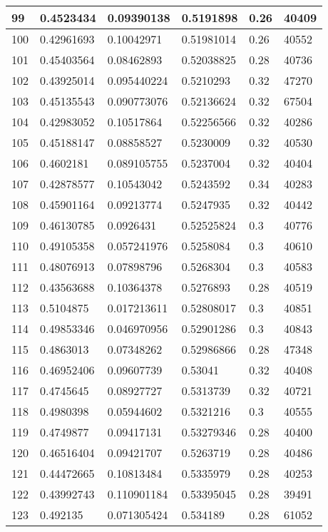 \begin{longtable}{|l|l|l|l|l|l|}
99 & 0.4523434 & 0.09390138 & 0.5191898 & 0.26 & 40409 \\ \hline 
100 & 0.42961693 & 0.10042971 & 0.51981014 & 0.26 & 40552 \\ \hline 
101 & 0.45403564 & 0.08462893 & 0.52038825 & 0.28 & 40736 \\ \hline 
102 & 0.43925014 & 0.095440224 & 0.5210293 & 0.32 & 47270 \\ \hline 
103 & 0.45135543 & 0.090773076 & 0.52136624 & 0.32 & 67504 \\ \hline 
104 & 0.42983052 & 0.10517864 & 0.52256566 & 0.32 & 40286 \\ \hline 
105 & 0.45188147 & 0.08858527 & 0.5230009 & 0.32 & 40530 \\ \hline 
106 & 0.4602181 & 0.089105755 & 0.5237004 & 0.32 & 40404 \\ \hline 
107 & 0.42878577 & 0.10543042 & 0.5243592 & 0.34 & 40283 \\ \hline 
108 & 0.45901164 & 0.09213774 & 0.5247935 & 0.32 & 40442 \\ \hline 
109 & 0.46130785 & 0.0926431 & 0.52525824 & 0.3 & 40776 \\ \hline 
110 & 0.49105358 & 0.057241976 & 0.5258084 & 0.3 & 40610 \\ \hline 
111 & 0.48076913 & 0.07898796 & 0.5268304 & 0.3 & 40583 \\ \hline 
112 & 0.43563688 & 0.10364378 & 0.5276893 & 0.28 & 40519 \\ \hline 
113 & 0.5104875 & 0.017213611 & 0.52808017 & 0.3 & 40851 \\ \hline 
114 & 0.49853346 & 0.046970956 & 0.52901286 & 0.3 & 40843 \\ \hline 
115 & 0.4863013 & 0.07348262 & 0.52986866 & 0.28 & 47348 \\ \hline 
116 & 0.46952406 & 0.09607739 & 0.53041 & 0.32 & 40408 \\ \hline 
117 & 0.4745645 & 0.08927727 & 0.5313739 & 0.32 & 40721 \\ \hline 
118 & 0.4980398 & 0.05944602 & 0.5321216 & 0.3 & 40555 \\ \hline 
119 & 0.4749877 & 0.09417131 & 0.53279346 & 0.28 & 40400 \\ \hline 
120 & 0.46516404 & 0.09421707 & 0.5263719 & 0.28 & 40486 \\ \hline 
121 & 0.44472665 & 0.10813484 & 0.5335979 & 0.28 & 40253 \\ \hline 
122 & 0.43992743 & 0.110901184 & 0.53395045 & 0.28 & 39491 \\ \hline 
123 & 0.492135 & 0.071305424 & 0.534189 & 0.28 & 61052 \\ \hline 

\end{longtable}
